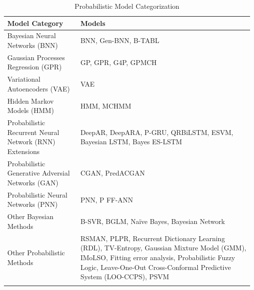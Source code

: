 \begin{table}[H]
    \centering
    \caption[Model Categorization]{Probabilistic Model Categorization}
    \label{table:model_categorization}
    \small
    \begin{adjustbox}{width=0.5\textwidth,center}
    \begin{tabular}{p{}p{}}
        \toprule
        \textbf{Model Category} & \textbf{Models} \\
        \midrule
        Bayesian Neural Networks (BNN) & BNN, Gen-BNN, B-TABL \\
        \addlinespace
        \hdashline[0.2pt/3pt]
        \addlinespace
        Gaussian Processes Regression (GPR) & GP, GPR, G4P, GPMCH \\
        \addlinespace
        \hdashline[0.2pt/3pt]
        \addlinespace
        Variational Autoencoders (VAE) & VAE \\
        \addlinespace
        \hdashline[0.2pt/3pt]
        \addlinespace
        Hidden Markov Models (HMM) & HMM, MCHMM \\
        \addlinespace
        \hdashline[0.2pt/3pt]
        \addlinespace
        Probabilistic Recurrent Neural Network (RNN) Extensions & DeepAR, DeepARA, P-GRU, QRBiLSTM, ESVM, Bayesian LSTM, Bayes ES-LSTM \\
        \addlinespace
        \hdashline[0.2pt/3pt]
        \addlinespace
        Probabilistic Generative Adversial Networks (GAN) & CGAN, PredACGAN \\
        \addlinespace
        \hdashline[0.2pt/3pt]
        \addlinespace
        Probabilistic Neural Networks (PNN) & PNN, P FF-ANN \\
        \addlinespace
        \hdashline[0.2pt/3pt]
        \addlinespace
        Other Bayesian Methods & B-SVR, BGLM, Naïve Bayes, Bayesian Network \\
        \addlinespace
        \hdashline[0.2pt/3pt]
        \addlinespace
        Other Probabilistic Methods & RSMAN, PLPR, Recurrent Dictionary Learning (RDL), TV-Entropy, Gaussian Mixture Model (GMM), IMoLSO, Fitting error analysis, Probabilistic Fuzzy Logic, Leave-One-Out Cross-Conformal Predictive System (LOO-CCPS), PSVM  \\
        \addlinespace
        \addlinespace
        \bottomrule
    \end{tabular}
    \end{adjustbox}
\end{table}

